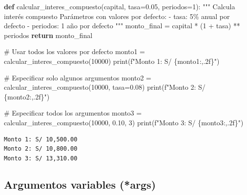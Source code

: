 \documentclass[
  doc,
  floatsintext,
  longtable,
  a4paper,
  nolmodern,
  notxfonts,
  notimes,
  12pt,
  colorlinks=true,linkcolor=blue,citecolor=blue,urlcolor=blue]{apa7}
\newenvironment{Shaded}{\begin{snugshade}}{\end{snugshade}}
\newcommand{\BuiltInTok}[1]{\textcolor[rgb]{0.00,0.23,0.31}{#1}}
\newcommand{\CommentTok}[1]{\textcolor[rgb]{0.37,0.37,0.37}{#1}}
\newcommand{\ControlFlowTok}[1]{\textcolor[rgb]{0.00,0.23,0.31}{\textbf{#1}}}
\newcommand{\DecValTok}[1]{\textcolor[rgb]{0.68,0.00,0.00}{#1}}
\newcommand{\FloatTok}[1]{\textcolor[rgb]{0.68,0.00,0.00}{#1}}
\newcommand{\KeywordTok}[1]{\textcolor[rgb]{0.00,0.23,0.31}{\textbf{#1}}}
\newcommand{\NormalTok}[1]{\textcolor[rgb]{0.00,0.23,0.31}{#1}}
\newcommand{\OperatorTok}[1]{\textcolor[rgb]{0.37,0.37,0.37}{#1}}
\newcommand{\SpecialCharTok}[1]{\textcolor[rgb]{0.37,0.37,0.37}{#1}}
\newcommand{\SpecialStringTok}[1]{\textcolor[rgb]{0.13,0.47,0.30}{#1}}
\begin{document}
\begin{Shaded}
\begin{Highlighting}[]
\KeywordTok{def}\NormalTok{ calcular\_interes\_compuesto(capital, tasa}\OperatorTok{=}\FloatTok{0.05}\NormalTok{, periodos}\OperatorTok{=}\DecValTok{1}\NormalTok{):}
    \CommentTok{"""}
\CommentTok{    Calcula interés compuesto}
\CommentTok{    }
\CommentTok{    Parámetros con valores por defecto:}
\CommentTok{    {-} tasa: 5\% anual por defecto}
\CommentTok{    {-} periodos: 1 año por defecto}
\CommentTok{    """}
\NormalTok{    monto\_final }\OperatorTok{=}\NormalTok{ capital }\OperatorTok{*}\NormalTok{ (}\DecValTok{1} \OperatorTok{+}\NormalTok{ tasa) }\OperatorTok{**}\NormalTok{ periodos}
    \ControlFlowTok{return}\NormalTok{ monto\_final}

\CommentTok{\# Usar todos los valores por defecto}
\NormalTok{monto1 }\OperatorTok{=}\NormalTok{ calcular\_interes\_compuesto(}\DecValTok{10000}\NormalTok{)}
\BuiltInTok{print}\NormalTok{(}\SpecialStringTok{f"Monto 1: S/ }\SpecialCharTok{\{}\NormalTok{monto1}\SpecialCharTok{:,.2f\}}\SpecialStringTok{"}\NormalTok{)}

\CommentTok{\# Especificar solo algunos argumentos}
\NormalTok{monto2 }\OperatorTok{=}\NormalTok{ calcular\_interes\_compuesto(}\DecValTok{10000}\NormalTok{, tasa}\OperatorTok{=}\FloatTok{0.08}\NormalTok{)}
\BuiltInTok{print}\NormalTok{(}\SpecialStringTok{f"Monto 2: S/ }\SpecialCharTok{\{}\NormalTok{monto2}\SpecialCharTok{:,.2f\}}\SpecialStringTok{"}\NormalTok{)}

\CommentTok{\# Especificar todos los argumentos}
\NormalTok{monto3 }\OperatorTok{=}\NormalTok{ calcular\_interes\_compuesto(}\DecValTok{10000}\NormalTok{, }\FloatTok{0.10}\NormalTok{, }\DecValTok{3}\NormalTok{)}
\BuiltInTok{print}\NormalTok{(}\SpecialStringTok{f"Monto 3: S/ }\SpecialCharTok{\{}\NormalTok{monto3}\SpecialCharTok{:,.2f\}}\SpecialStringTok{"}\NormalTok{)}
\end{Highlighting}
\end{Shaded}

\begin{verbatim}
Monto 1: S/ 10,500.00
Monto 2: S/ 10,800.00
Monto 3: S/ 13,310.00
\end{verbatim}

\subsection{Argumentos variables
(*args)}\label{argumentos-variables-args}
\end{document}
